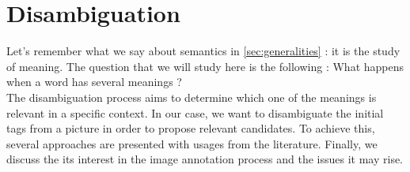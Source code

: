 
\chapter{Disambiguation} %

\label{chapter:Disambiguation} %


Let's remember what we say about semantics in \ref{sec:generalities} : it is the study of meaning. The question that we will study here is the following : What happens when a word has several meanings ?\\
The disambiguation process aims to determine which one of the meanings is relevant in a specific context. In our case, we want to disambiguate the initial tags from a picture in order to propose relevant candidates. To achieve this, several approaches are presented with usages from the literature. Finally, we discuss the its interest in the image annotation process and the issues it may rise. 

